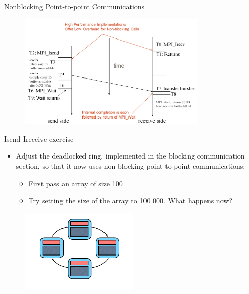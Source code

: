 \begin{frame}[fragile]{Nonblocking Point-to-point Communications}
\vspace{-4mm}
\begin{figure}
    \centering
    \includegraphics[width=0.8\textwidth]{img/nonblockingMPI.png}
\end{figure} 


\end{frame}

\begin{frame}[fragile]{Isend-Ireceive exercise}

\begin{itemize}
\item Adjust the deadlocked ring, implemented in the blocking communication section, so that it now uses non blocking point-to-point communications: 
    \begin{itemize}
    \vspace{2mm}
    \item First pass an array of size 100
      \vspace{2mm}
    \item Try setting the size of the array to 100 000. What happens now? 
    \end{itemize}
\end{itemize}

\begin{figure}
    \centering
    \includegraphics[width=0.5\textwidth]{img/mpiring.png}
\end{figure} 
   
 
    
\end{frame}


